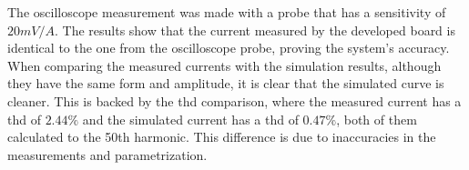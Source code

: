  The oscilloscope measurement was made with a probe that has a sensitivity of $20mV/A$. The results show that the current measured by the developed board is identical to the one from the oscilloscope probe, proving the system's accuracy. When comparing the measured currents with the simulation results, although they have the same form and amplitude, it is clear that the simulated curve is cleaner. This is backed by the \gls{thd} comparison, where the measured current has a \gls{thd} of $2.44\%$ and the simulated current has a \gls{thd} of $0.47\%$, both of them calculated to the 50th harmonic. This difference is due to inaccuracies in the measurements and parametrization. 

